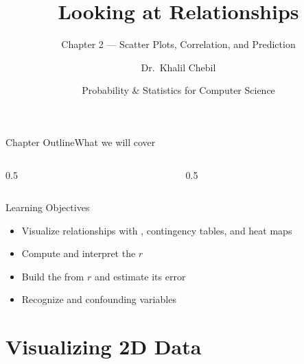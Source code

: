 \documentclass[aspectratio=169,11pt]{beamer}
\title[Ch.\,2 — Relationships]{Looking at Relationships}
\subtitle{Chapter 2 — Scatter Plots, Correlation, and Prediction}
\author{Dr.\ Khalil Chebil}
\date{Probability \& Statistics for Computer Science}
\begin{document}
{
\begin{frame}
  \titlepage
\end{frame}}

\begin{frame}{Chapter Outline}{What we will cover}
  \begin{columns}[T]
    \begin{column}{0.5\textwidth}
      \tableofcontents[sections={1-4}]
    \end{column}
    \begin{column}{0.5\textwidth}
      \tableofcontents[sections={5-7}]
    \end{column}
  \end{columns}
  \vfill
  \begin{block}{Learning Objectives}
    \begin{itemize}
      \item Visualize relationships with , contingency tables, and heat maps
      \item Compute and interpret the  $r$
      \item Build the  from $r$ and estimate its error
      \item Recognize  and confounding variables
    \end{itemize}
  \end{block}
\end{frame}

\section{Visualizing 2D Data}
\end{document}
